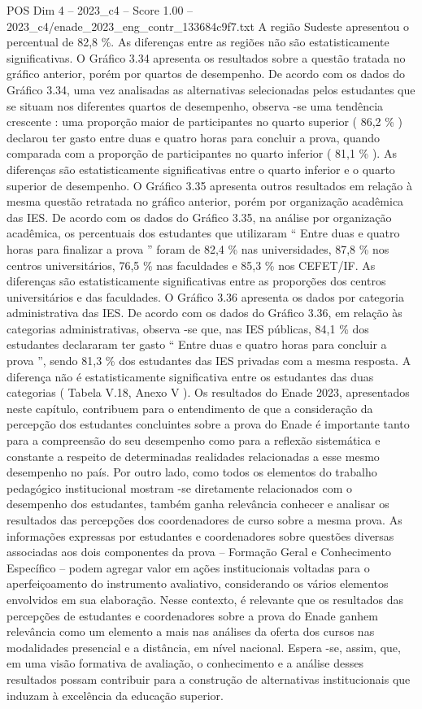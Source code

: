 \begin{textsample}{POS Dim 4 – 2023\_c4 – Score 1.00 – 2023\_c4/enade\_2023\_eng\_contr\_133684c9f7.txt}
A região Sudeste apresentou o percentual de 82,8 \%.
As diferenças entre as regiões não são estatisticamente significativas.
O Gráfico 3.34 apresenta os resultados sobre a questão tratada no gráfico anterior, porém por quartos de desempenho.
De acordo com os dados do Gráfico 3.34, uma vez analisadas as alternativas selecionadas pelos estudantes que se situam nos diferentes quartos de desempenho, observa -se uma tendência crescente : uma proporção maior de participantes no quarto superior ( 86,2 \% ) declarou ter gasto entre duas e quatro horas para concluir a prova, quando comparada com a proporção de participantes no quarto inferior ( 81,1 \% ).
As diferenças são estatisticamente significativas entre o quarto inferior e o quarto superior de desempenho.
O Gráfico 3.35 apresenta outros resultados em relação à mesma questão retratada no gráfico anterior, porém por organização acadêmica das IES.
De acordo com os dados do Gráfico 3.35, na análise por organização acadêmica, os percentuais dos estudantes que utilizaram “ Entre duas e quatro horas para finalizar a prova ” foram de 82,4 \% nas universidades, 87,8 \% nos centros universitários, 76,5 \% nas faculdades e 85,3 \% nos CEFET/IF.
As diferenças são estatisticamente significativas entre as proporções dos centros universitários e das faculdades.
O Gráfico 3.36 apresenta os dados por categoria administrativa das IES.
De acordo com os dados do Gráfico 3.36, em relação às categorias administrativas, observa -se que, nas IES públicas, 84,1 \% dos estudantes declararam ter gasto “ Entre duas e quatro horas para concluir a prova ”, sendo 81,3 \% dos estudantes das IES privadas com a mesma resposta.
A diferença não é estatisticamente significativa entre os estudantes das duas categorias ( Tabela V.18, Anexo V ).
Os resultados do Enade 2023, apresentados neste capítulo, contribuem para o entendimento de que a consideração da percepção dos estudantes concluintes sobre a prova do Enade é importante tanto para a compreensão do seu desempenho como para a reflexão sistemática e constante a respeito de determinadas realidades relacionadas a esse mesmo desempenho no país.
Por outro lado, como todos os elementos do trabalho pedagógico institucional mostram -se diretamente relacionados com o desempenho dos estudantes, também ganha relevância conhecer e analisar os resultados das percepções dos coordenadores de curso sobre a mesma prova.
As informações expressas por estudantes e coordenadores sobre questões diversas associadas aos dois componentes da prova – Formação Geral e Conhecimento Específico – podem agregar valor em ações institucionais voltadas para o aperfeiçoamento do instrumento avaliativo, considerando os vários elementos envolvidos em sua elaboração.
Nesse contexto, é relevante que os resultados das percepções de estudantes e coordenadores sobre a prova do Enade ganhem relevância como um elemento a mais nas análises da oferta dos cursos nas modalidades presencial e a distância, em nível nacional.
Espera -se, assim, que, em uma visão formativa de avaliação, o conhecimento e a análise desses resultados possam contribuir para a construção de alternativas institucionais que induzam à excelência da educação superior.

\end{textsample}
